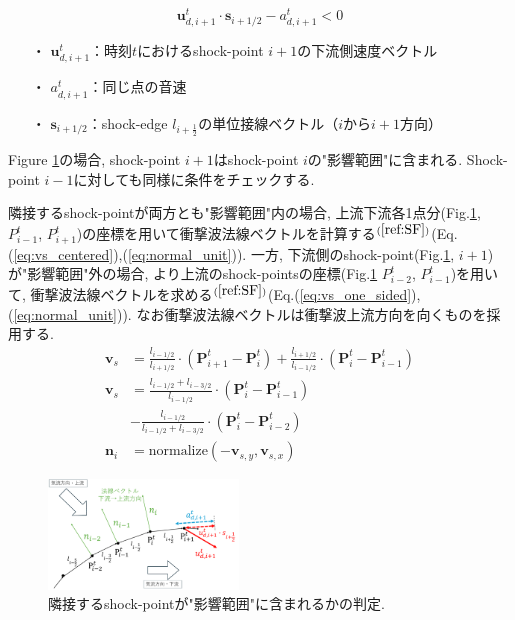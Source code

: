 \documentclass[a4j]{jarticle}
\begin{document}
\begin{equation}
\bm{u}_{d,i+1}^t \cdot \bm{s}_{i+1/2} - a_{d,i+1}^t < 0 \label{eq:dependence_condition}
\end{equation}
\begin{itemize}
\item[・] $\bm{u}_{d,i+1}^t$：時刻$t$におけるshock-point $i+1$の下流側速度ベクトル
\item[・] $a_{d,i+1}^t$：同じ点の音速
\item[・] $\bm{s}_{i+1/2}$：shock-edge $l_{i+\frac{1}{2}}$の単位接線ベクトル（$i$から$i+1$方向）
\end{itemize}
Figure \ref{fig:shocknormal}の場合, shock-point $i+1$はshock-point $i$の"影響範囲"に含まれる.
Shock-point $i-1$に対しても同様に条件をチェックする.

隣接するshock-pointが両方とも"影響範囲"内の場合, 上流下流各1点分(Fig.\ref{fig:shocknormal}, $P_{i-1}^t$, $P_{i+1}^t$)の座標を用いて衝撃波法線ベクトルを計算する$^{(\ref{ref:SF})}$(Eq.(\ref{eq:vs_centered}),(\ref{eq:normal_unit})).
一方, 下流側のshock-point(Fig.\ref{fig:shocknormal}, $i+1$)が"影響範囲"外の場合, 
より上流のshock-pointsの座標(Fig.\ref{fig:shocknormal} $P_{i-2}^t$, $P_{i-1}^t$)を用いて, 衝撃波法線ベクトルを求める$^{(\ref{ref:SF})}$(Eq.(\ref{eq:vs_one_sided}),(\ref{eq:normal_unit})).
なお衝撃波法線ベクトルは衝撃波上流方向を向くものを採用する.
\begin{align}
  \bm{v}_s &= \frac{l_{i-1/2}}{l_{i+1/2}} \cdot \left(\bm{P}_{i+1}^t - \bm{P}_i^t \right)
  + \frac{l_{i+1/2}}{l_{i-1/2}} \cdot \left(\bm{P}_i^t - \bm{P}_{i-1}^t \right) \label{eq:vs_centered} \\
  \bm{v}_s &= \frac{l_{i-1/2} + l_{i-3/2}}{l_{i-1/2}} \cdot \left(\bm{P}_i^t - \bm{P}_{i-1}^t \right) \nonumber \\
  &- \frac{l_{i-1/2}}{l_{i-1/2} + l_{i-3/2}} \cdot \left(\bm{P}_i^t - \bm{P}_{i-2}^t \right)\label{eq:vs_one_sided} \\
  \bm{n}_i &= \text{normalize}(-\bm{v}_{s,y}, \bm{v}_{s,x}) \label{eq:normal_unit}
\end{align}


\begin{figure}[h]
    \begin{center}
        \includegraphics[width=0.45\textwidth]{shocknormal.pdf}
    \end{center}
    \caption{隣接するshock-pointが"影響範囲"に含まれるかの判定.}
    \label{fig:shocknormal}
\end{figure}
\end{document}
